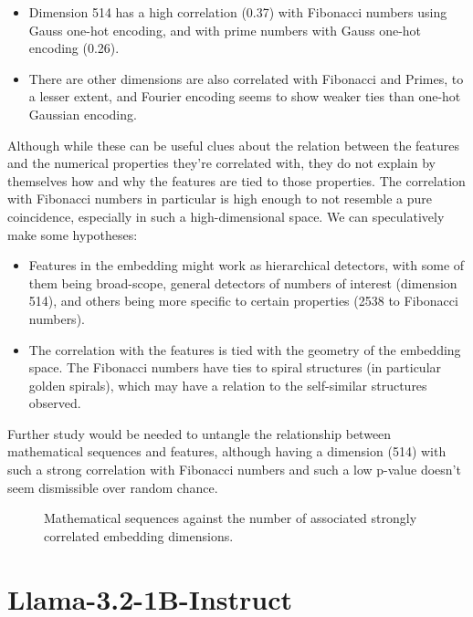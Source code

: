 \documentclass[
  a4paper, twoside, 10pt, titlepage]{book}
\providecommand{\tightlist}{%
  \setlength{\itemsep}{0pt}\setlength{\parskip}{0pt}}
\begin{document}
\begin{itemize}
\tightlist
\item
  Dimension 514 has a high correlation (0.37) with Fibonacci numbers
  using Gauss one-hot encoding, and with prime numbers with Gauss
  one-hot encoding (0.26).
\item
  There are other dimensions are also correlated with Fibonacci and
  Primes, to a lesser extent, and Fourier encoding seems to show weaker
  ties than one-hot Gaussian encoding.
\end{itemize}

Although while these can be useful clues about the relation between the
features and the numerical properties they're correlated with, they do
not explain by themselves how and why the features are tied to those
properties. The correlation with Fibonacci numbers in particular is high
enough to not resemble a pure coincidence, especially in such a
high-dimensional space. We can speculatively make some hypotheses:

\begin{itemize}
\tightlist
\item
  Features in the embedding might work as hierarchical detectors, with
  some of them being broad-scope, general detectors of numbers of
  interest (dimension 514), and others being more specific to certain
  properties (2538 to Fibonacci numbers).
\item
  The correlation with the features is tied with the geometry of the
  embedding space. The Fibonacci numbers have ties to spiral structures
  (in particular golden spirals), which may have a relation to the
  self-similar structures observed.
\end{itemize}

Further study would be needed to untangle the relationship between
mathematical sequences and features, although having a dimension (514)
with such a strong correlation with Fibonacci numbers and such a low
p-value doesn't seem dismissible over random chance.

\begin{figure}
\centering

\caption{Mathematical sequences against the number of associated
strongly correlated embedding dimensions.}\label{fig:olmo-properties}
\end{figure}

\clearpage

\section{Llama-3.2-1B-Instruct}\label{llama-3.2-1b-instruct}
\end{document}
